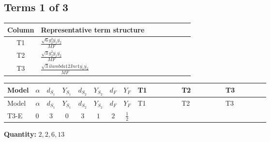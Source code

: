 \documentclass[8pt]{article}
\begin{document}
\begin{landscape}
\subsection*{Terms 1 of 3}
\begin{center}
\begin{tabular}{@{}c >{\raggedright\arraybackslash}p{0.82\linewidth}@{}}
\toprule
Column & Representative term structure \\
\midrule
T1 & \(\displaystyle \frac{\sqrt{6} g_{2}^{2} \overline{y_{1}} \overline{y_{2}}}{MF}\) \\
\midrule
T2 & \(\displaystyle \frac{\sqrt{3} g_{2}^{2} \overline{y_{1}} \overline{y_{2}}}{MF}\) \\
\midrule
T3 & \(\displaystyle \frac{\sqrt{3} i lambda12Inv1 \overline{y_{1}} \overline{y_{2}}}{MF}\) \\
\midrule
\bottomrule
\end{tabular}
\end{center}
\smallskip
\tiny
\begin{longtable}{@{}llcccccc >{\raggedright\arraybackslash}p{0.21\linewidth} >{\raggedright\arraybackslash}p{0.21\linewidth} >{\raggedright\arraybackslash}p{0.21\linewidth}@{}}
\toprule
Model & $\alpha$ & $d_{S_1}$ & $Y_{S_1}$ & $d_{S_2}$ & $Y_{S_2}$ & $d_F$ & $Y_F$ & T1 & T2 & T3 \\
\midrule
\endfirsthead
\toprule
Model & $\alpha$ & $d_{S_1}$ & $Y_{S_1}$ & $d_{S_2}$ & $Y_{S_2}$ & $d_F$ & $Y_F$ & T1 & T2 & T3 \\
\midrule
\endhead
T3-E & $0$ & $3$ & $0$ & $3$ & $1$ & $2$ & $\frac{1}{2}$ & \scriptsize\adjustbox{max width=\linewidth}{$\begin{gathered} \frac{\sqrt{6} g_{2}^{2} \overline{y_{1}} \overline{y_{2}}}{3 MF}\end{gathered}$} & \scriptsize\adjustbox{max width=\linewidth}{$\begin{gathered} \frac{\sqrt{3} g_{2}^{2} \overline{y_{1}} \overline{y_{2}}}{6 MF}\end{gathered}$} & \scriptsize\adjustbox{max width=\linewidth}{$\begin{gathered} - \frac{\sqrt{3} i lambda12Inv1 \overline{y_{1}} \overline{y_{2}}}{6 MF}\end{gathered}$} \\
\midrule
\bottomrule
\end{longtable}
\clearpage
\noindent\textbf{Quantity: }$\mathrm{2,2,6,13}$\par\smallskip

\end{landscape}
\end{document}
